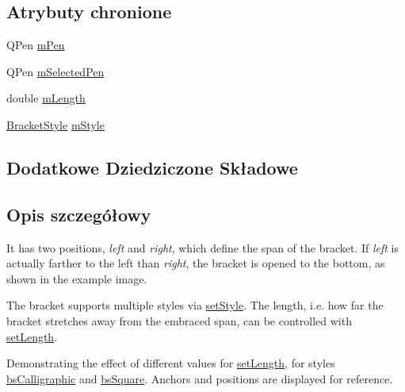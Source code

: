 \subsection*{Atrybuty chronione}
\begin{DoxyCompactItemize}
\item 
Q\+Pen \hyperlink{class_q_c_p_item_bracket_a350c864a5853b04343719f5a8be6b675}{m\+Pen}
\item 
Q\+Pen \hyperlink{class_q_c_p_item_bracket_adcfb53602d1802d00e2de4fd6df6b291}{m\+Selected\+Pen}
\item 
double \hyperlink{class_q_c_p_item_bracket_ab3d99bba8da18eb4d0e0cb23dded33b2}{m\+Length}
\item 
\hyperlink{class_q_c_p_item_bracket_a7ac3afd0b24a607054e7212047d59dbd}{Bracket\+Style} \hyperlink{class_q_c_p_item_bracket_ac911907184c824d621f274f8e0990080}{m\+Style}
\end{DoxyCompactItemize}
\subsection*{Dodatkowe Dziedziczone Składowe}


\subsection{Opis szczegółowy}
 It has two positions, {\itshape left} and {\itshape right}, which define the span of the bracket. If {\itshape left} is actually farther to the left than {\itshape right}, the bracket is opened to the bottom, as shown in the example image.

The bracket supports multiple styles via \hyperlink{class_q_c_p_item_bracket_a612dffa2373422eef8754d690add3703}{set\+Style}. The length, i.\+e. how far the bracket stretches away from the embraced span, can be controlled with \hyperlink{class_q_c_p_item_bracket_ac7cfc3da7da9b5c5ac5dfbe4f0351b2a}{set\+Length}.

 \begin{center}Demonstrating the effect of different values for \hyperlink{class_q_c_p_item_bracket_ac7cfc3da7da9b5c5ac5dfbe4f0351b2a}{set\+Length}, for styles \hyperlink{class_q_c_p_item_bracket_a7ac3afd0b24a607054e7212047d59dbda8f29f5ef754e2dc9a9efdedb2face0f3}{bs\+Calligraphic} and \hyperlink{class_q_c_p_item_bracket_a7ac3afd0b24a607054e7212047d59dbda7f9df4a7359bfe3dac1dbe4ccf5d220c}{bs\+Square}. Anchors and positions are displayed for reference.\end{center} 

